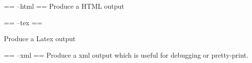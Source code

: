 == --html ==
Produce a HTML output

== --tex ==

Produce a Latex output

== --xml ==
Produce a xml output which is useful for debugging or pretty-print.

